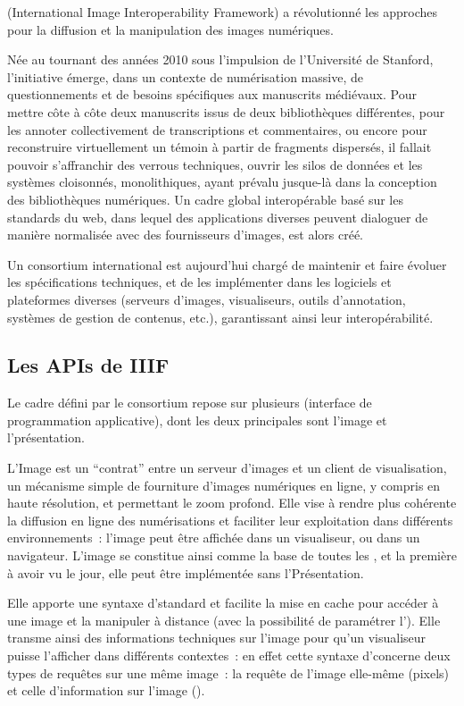 \iiif (International Image Interoperability Framework) a révolutionné les
approches pour la diffusion et la manipulation des images numériques.

Née au tournant des années 2010 sous l'impulsion de l'Université de
Stanford, l'initiative émerge, dans un contexte de numérisation massive,
de questionnements et de besoins spécifiques aux manuscrits médiévaux.
Pour mettre côte à côte deux manuscrits issus de deux bibliothèques
différentes, pour les annoter collectivement de transcriptions et
commentaires, ou encore pour reconstruire virtuellement un témoin à
partir de fragments dispersés, il fallait pouvoir s'affranchir des
verrous techniques, ouvrir les silos de données et les systèmes
cloisonnés, monolithiques, ayant prévalu jusque-là dans la conception
des bibliothèques numériques. Un cadre global interopérable basé sur les
standards du web, dans lequel des applications diverses peuvent
dialoguer de manière normalisée avec des fournisseurs d'images, est alors
créé.

Un consortium international est aujourd'hui chargé de maintenir et faire
évoluer les spécifications techniques, et de les implémenter dans les
logiciels et plateformes diverses (serveurs d'images, visualiseurs,
outils d'annotation, systèmes de gestion de contenus, etc.),
garantissant ainsi leur interopérabilité.

\hypertarget{les-apis-de-iiif}{%
\subsection{Les APIs de IIIF}\label{les-apis-de-iiif}}

Le cadre défini par le consortium \iiif repose sur plusieurs \apis
(interface de programmation applicative), dont les deux principales sont
l'\api image et l'\api présentation.

L'\api Image est un ``contrat'' entre un serveur d'images et un client de
visualisation, un mécanisme simple de fourniture d'images numériques en
ligne, y compris en haute résolution, et permettant le zoom profond.
Elle vise à rendre plus cohérente la diffusion en ligne des
numérisations et faciliter leur exploitation dans différents
environnements~: l'image peut être aﬀichée dans un visualiseur, ou dans
un navigateur. L'\api image se constitue ainsi comme la base de toutes
les \apis \iiif, et la première à avoir vu le jour, elle peut être
implémentée sans l'\api Présentation.

Elle apporte une syntaxe d'\URL standard et facilite la mise en cache
pour accéder à une image et la manipuler à distance (avec la possibilité
de paramétrer l'\URL). Elle transme ainsi des informations techniques sur
l'image pour qu'un visualiseur puisse l'afficher dans différents
contextes~: en effet cette syntaxe d'\URL concerne deux types de requêtes
sur une même image~: la requête de l'image elle-même (pixels) et celle
d'information sur l'image (\json).


